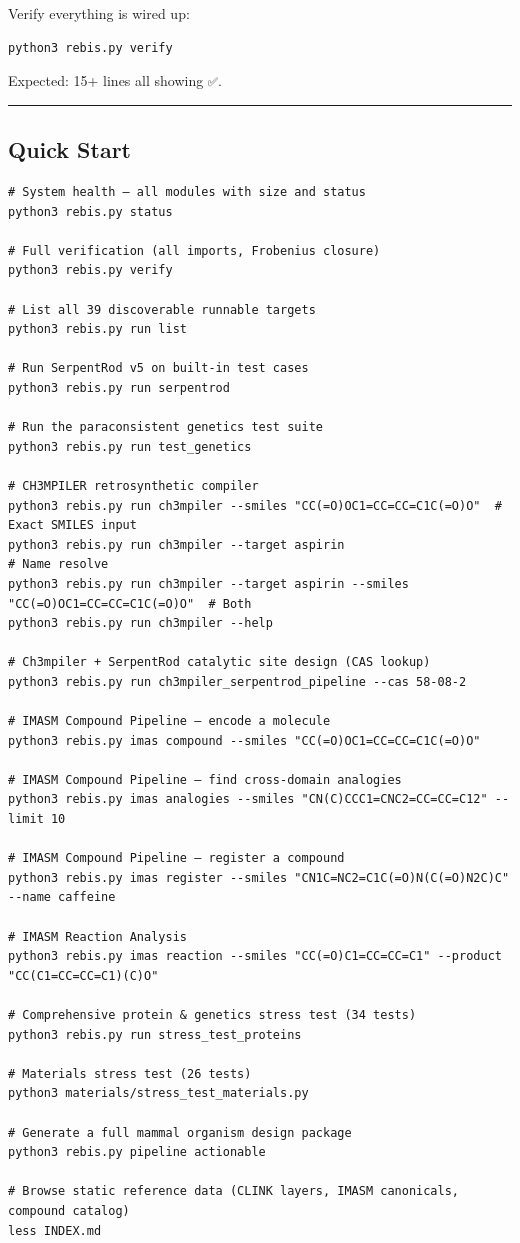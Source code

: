 Verify everything is wired up:

\begin{verbatim}
python3 rebis.py verify
\end{verbatim}

Expected: 15+ lines all showing \texttt{✅}.

\begin{center}\rule{0.5\linewidth}{0.5pt}\end{center}

\hypertarget{quick-start}{%
\subsection{Quick Start}\label{quick-start}}

\begin{verbatim}
# System health — all modules with size and status
python3 rebis.py status

# Full verification (all imports, Frobenius closure)
python3 rebis.py verify

# List all 39 discoverable runnable targets
python3 rebis.py run list

# Run SerpentRod v5 on built-in test cases
python3 rebis.py run serpentrod

# Run the paraconsistent genetics test suite
python3 rebis.py run test_genetics

# CH3MPILER retrosynthetic compiler
python3 rebis.py run ch3mpiler --smiles "CC(=O)OC1=CC=CC=C1C(=O)O"  # Exact SMILES input
python3 rebis.py run ch3mpiler --target aspirin                                   # Name resolve
python3 rebis.py run ch3mpiler --target aspirin --smiles "CC(=O)OC1=CC=CC=C1C(=O)O"  # Both
python3 rebis.py run ch3mpiler --help

# Ch3mpiler + SerpentRod catalytic site design (CAS lookup)
python3 rebis.py run ch3mpiler_serpentrod_pipeline --cas 58-08-2

# IMASM Compound Pipeline — encode a molecule
python3 rebis.py imas compound --smiles "CC(=O)OC1=CC=CC=C1C(=O)O"

# IMASM Compound Pipeline — find cross-domain analogies
python3 rebis.py imas analogies --smiles "CN(C)CCC1=CNC2=CC=CC=C12" --limit 10

# IMASM Compound Pipeline — register a compound
python3 rebis.py imas register --smiles "CN1C=NC2=C1C(=O)N(C(=O)N2C)C" --name caffeine

# IMASM Reaction Analysis
python3 rebis.py imas reaction --smiles "CC(=O)C1=CC=CC=C1" --product "CC(C1=CC=CC=C1)(C)O"

# Comprehensive protein & genetics stress test (34 tests)
python3 rebis.py run stress_test_proteins

# Materials stress test (26 tests)
python3 materials/stress_test_materials.py

# Generate a full mammal organism design package
python3 rebis.py pipeline actionable

# Browse static reference data (CLINK layers, IMASM canonicals, compound catalog)
less INDEX.md
\end{verbatim}


